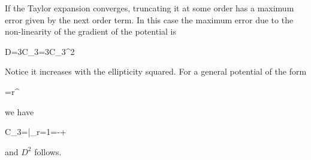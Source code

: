 If the Taylor expansion converges, truncating it at some order has a maximum error given by the next order 
term. In this case the maximum error due to the non-linearity of the gradient of the potential is 

\beq
D=3C_3\max[dr_c^2]=3C_3\eta^2
\eeq

Notice it increases with the ellipticity squared. For a general potential of the form

\beq
\phi=r^{\alpha[1+\beta(r-1)]}
\eeq

we have

\beq
C_3=|_{r=1}=-+
\eeq

and $D^2$ follows. 




